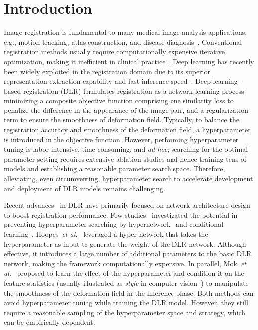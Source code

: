 \documentclass[runningheads]{llncs}
\begin{document}
\section{Introduction}
Image registration is fundamental to many medical image analysis applications, e.g., motion tracking, atlas construction, and disease diagnosis~\cite{chen2021deep}. Conventional registration methods usually require computationally expensive iterative optimization, making it inefficient in clinical practice~\cite{vercauteren2009diffeomorphic,avants2008symmetric}. Deep learning has recently been widely exploited in the registration domain due to its superior representation extraction capability and fast inference speed~\cite{balakrishnan2018unsupervised,dalca2018unsupervised}. Deep-learning-based registration (DLR) formulates registration as a network learning process minimizing a composite objective function comprising one similarity loss to penalize the difference in the appearance of the image pair, and a regularization term to ensure the smoothness of deformation field. Typically, to balance the registration accuracy and smoothness of the deformation field, a hyperparameter is introduced in the objective function. However, performing hyperparameter tuning is labor-intensive, time-consuming, and \emph{ad-hoc}; searching for the optimal parameter setting requires extensive ablation studies and hence training tens of models and establishing a reasonable parameter search space. Therefore, alleviating, even circumventing, hyperparameter search to accelerate development and deployment of DLR models remains challenging.

Recent advances~\cite{huang2021difficulty,chen2021registration,jia2021learning} in DLR have primarily focused on network architecture design to boost registration performance. 
Few studies~\cite{hoopes2021hypermorph,mok2021conditional} investigated the potential in preventing hyperparameter searching by hypernetwork~\cite{ha2016hypernetworks} and conditional learning~\cite{huang2017arbitrary}. Hoopes~\textit{et al.}~\cite{hoopes2021hypermorph} leveraged a hyper-network that takes the hyperparameter as input to generate the weight of the DLR network. Although effective, it introduces a large number of additional parameters to the basic DLR network, making the framework computationally expensive. In parallel, Mok~\textit{et al.}~\cite{mok2021conditional} proposed to learn the effect of the hyperparameter and condition it on the feature statistics (usually illustrated as \textit{style} in computer vision~\cite{huang2017arbitrary}) to manipulate the smoothness of the deformation field in the inference phase. Both methods can avoid hyperparameter tuning while training the DLR model. However, they still require a reasonable sampling of the hyperparameter space and strategy, which can be empirically dependent.
\end{document}
